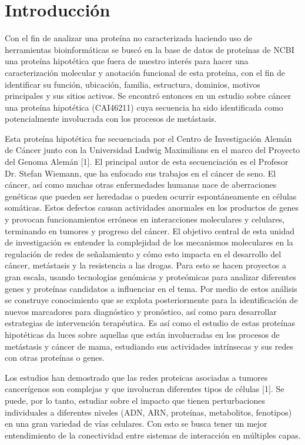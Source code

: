 \documentclass[journal,transmag]{IEEEtran}
\begin{document}
\section{Introducción}

Con el fin de analizar una proteína no caracterizada haciendo uso de herramientas bioinformáticas se buscó en la base de datos de proteínas de NCBI una proteína hipotética que fuera de nuestro interés para hacer una caracterización molecular y anotación funcional de esta proteína, con el fin de identificar su función, ubicación, familia, estructura, dominios, motivos principales y sus sitios activos.  Se encontró entonces en un estudio sobre cáncer una proteína hipotética (CAI46211) cuya secuencia ha sido identificada como potencialmente involucrada con los procesos de metástasis.

Esta proteína hipotética fue secuenciada por el Centro de Investigación Alemán de Cáncer junto con la Universidad Ludwig Maximilians en el marco del Proyecto del Genoma Alemán [1]. El principal autor de esta secuenciación es el Profesor Dr. Stefan Wiemann, que ha enfocado sus trabajos en el cáncer de seno. El cáncer, así como muchas otras enfermedades humanas nace de aberraciones genéticas que pueden ser heredadas o pueden ocurrir espontáneamente en células somáticas. Estos defectos causan actividades anormales en los productos de genes y provocan funcionamientos erróneos en interacciones moleculares y celulares, terminando en tumores y progreso del cáncer. El objetivo central de esta unidad de investigación es entender la complejidad de los mecanismos moleculares en la regulación de redes de señalamiento y cómo esto impacta en el desarrollo del cáncer, metástasis y la resistencia a las drogas. Para esto se hacen proyectos a gran escala, usando tecnologías genómicas y proteómicas para analizar diferentes genes y proteínas candidatos a influenciar en el tema. Por medio de estos análisis se construye conocimiento que se explota posteriormente para la identificación de nuevos marcadores para diagnóstico y pronóstico, así como para desarrollar estrategias de intervención terapéutica. Es así como el estudio de estas proteínas hipotéticas da luces sobre aquellas que están involucradas en los procesos de metástasis y cáncer de mama, estudiando sus actividades intrínsecas y sus redes con otras proteínas o genes. 

Los estudios han demostrado que las redes proteicas asociadas a tumores cancerígenos son complejas y que involucran diferentes tipos de células [1]. Se puede, por lo tanto, estudiar sobre el impacto que tienen perturbaciones individuales a diferentes niveles (ADN, ARN, proteínas, metabolitos, fenotipos) en una gran variedad de vías celulares. Con esto se busca tener un mejor entendimiento de la conectividad entre sistemas de interacción en múltiples capas. 
\end{document}
